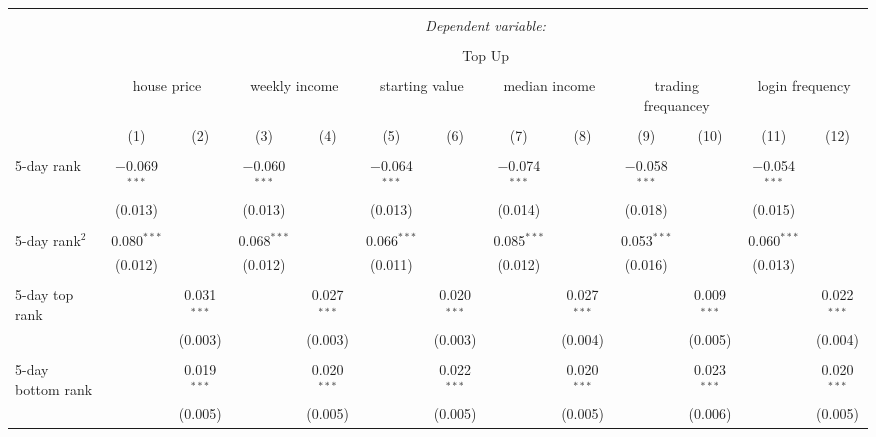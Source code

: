 




\begin{tabular}{@{\extracolsep{2pt}}lcccccccccccc} 
		\\[-1.8ex]\hline 
\hline \\[-1.8ex] 
& \multicolumn{12}{c}{\textit{Dependent variable:}} \\ 
\cline{2-13} 
\\[-1.8ex] & \multicolumn{12}{c}{Top Up} \\ 
\\[-1.8ex] & \multicolumn{2}{c}{house price}& \multicolumn{2}{c}{weekly income}& \multicolumn{2}{c}{starting value}& \multicolumn{2}{c}{median income}& \multicolumn{2}{c}{trading frequancey} & \multicolumn{2}{c}{login frequency}\\
\cmidrule(lr){2-3}
\cmidrule(lr){4-5}
\cmidrule(lr){6-7}
\cmidrule(lr){8-9}
\cmidrule(lr){10-11}
\cmidrule(lr){12-13}
\\[-1.8ex] & (1) & (2) & (3) & (4)& (5) & (6) & (7) & (8)& (9) & (10) & (11) & (12)\\ 
\hline \\[-1.8ex] 
5-day rank & $-$0.069$^{***}$ &  & $-$0.060$^{***}$ &  & $-$0.064$^{***}$ &  & $-$0.074$^{***}$ &  & $-$0.058$^{***}$ &  & $-$0.054$^{***}$ &  \\ 
& (0.013) &  & (0.013) &  & (0.013) &  & (0.014) &  & (0.018) &  & (0.015) &  \\ 
& & & & & & & & & & & & \\ 
5-day rank$^2$ & 0.080$^{***}$ &  & 0.068$^{***}$ &  & 0.066$^{***}$ &  & 0.085$^{***}$ &  & 0.053$^{***}$ &  & 0.060$^{***}$ &  \\ 
& (0.012) &  & (0.012) &  & (0.011) &  & (0.012) &  & (0.016) &  & (0.013) &  \\ 
& & & & & & & & & & & & \\ 
5-day top rank &  & 0.031$^{***}$ &  & 0.027$^{***}$ &  & 0.020$^{***}$ &  & 0.027$^{***}$ &  & 0.009$^{***}$ &  & 0.022$^{***}$ \\ 
&  & (0.003) &  & (0.003) &  & (0.003) &  & (0.004) &  & (0.005) &  & (0.004) \\ 
& & & & & & & & & & & & \\ 
5-day bottom rank &  & 0.019$^{***}$ &  & 0.020$^{***}$ &  & 0.022$^{***}$ &  & 0.020$^{***}$ &  & 0.023$^{***}$ &  & 0.020$^{***}$ \\ 
&  & (0.005) &  & (0.005) &  & (0.005) &  & (0.005) &  & (0.006) &  & (0.005) \\ 

\end{tabular}
